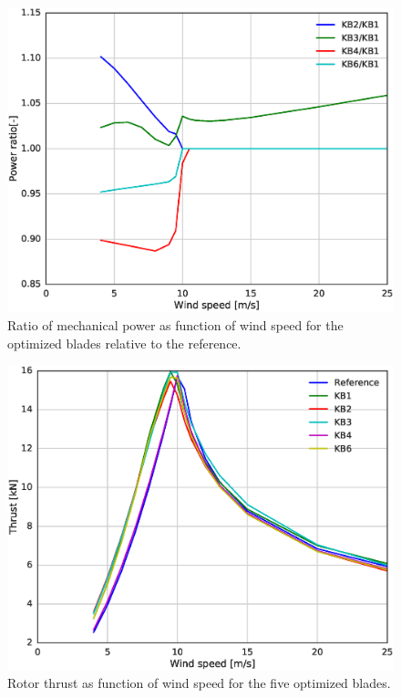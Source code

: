 \begin{figure}[pht]
\begin{center}
	\includegraphics[width=.85\linewidth]{figures/KBcomp_power_ratio.eps}
\end{center}
\caption{Ratio of mechanical power as function of wind speed for the optimized blades relative to the reference.}
\label{fig:powerratio}
\end{figure}

\begin{figure}[pht]
\begin{center}
	\includegraphics[width=.85\linewidth]{figures/KBcomp_thrust.eps}
\end{center}
\caption{Rotor thrust as function of wind speed for the five optimized blades.}
\label{fig:thrust}
\end{figure}

